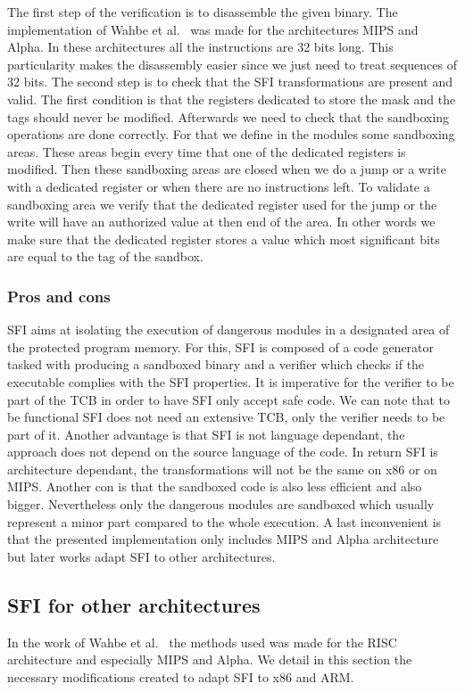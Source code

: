 \documentclass[11pt]{sdm}
\begin{document}
The first step of the verification is to disassemble the given binary. The implementation of Wahbe et al.~\cite{Wahbe:1993:ESF:173668.168635} was made for the architectures MIPS and Alpha. In these architectures all the instructions are 32 bits long. This particularity makes the disassembly easier since we just need to treat sequences of 32 bits. The second step is to check that the SFI transformations are present and valid. The first condition is that the registers dedicated to store the mask and the tags should never be modified. Afterwards we need to check that the sandboxing operations are done correctly. For that we define in the modules some sandboxing areas. These areas begin every time that one of the dedicated registers is modified. Then these sandboxing areas are closed when we do a jump or a write with a dedicated register or when there are no instructions left. To validate a sandboxing area we verify that the dedicated register used for the jump or the write will have an authorized value at then end of the area. In other words we make sure that the dedicated register stores a value which most significant bits are equal to the tag of the sandbox.

\subsubsection{Pros and cons}
\label{ssub:Pros and cons}

SFI aims at isolating the execution of dangerous modules in a designated area of the protected program memory. For this, SFI is composed of a code generator tasked with producing a sandboxed binary and a verifier which checks if the executable complies with the SFI properties.
It is imperative for the verifier to be  part of the TCB in order to have SFI only accept safe code. %
We can note that to be functional SFI does not need an extensive TCB, only the verifier needs to be part of it. Another advantage is that SFI is not language dependant, the approach does not depend on the source language of the code. In return SFI is architecture dependant, the transformations will not be the same on x86 or on MIPS. Another con is that the sandboxed code is also less efficient and also bigger. Nevertheless only the dangerous modules are sandboxed which usually represent a minor part compared to the whole execution. A last inconvenient is that the presented implementation only includes MIPS and Alpha architecture but later works adapt SFI to other architectures.

\subsection{SFI for other architectures}
\label{sub:sfi_other}
In the work of Wahbe et al.~\cite{Wahbe:1993:ESF:173668.168635} the methods used was made for the RISC architecture and especially MIPS and Alpha. We detail in this section the necessary modifications created to adapt SFI to x86 and ARM.
\end{document}
